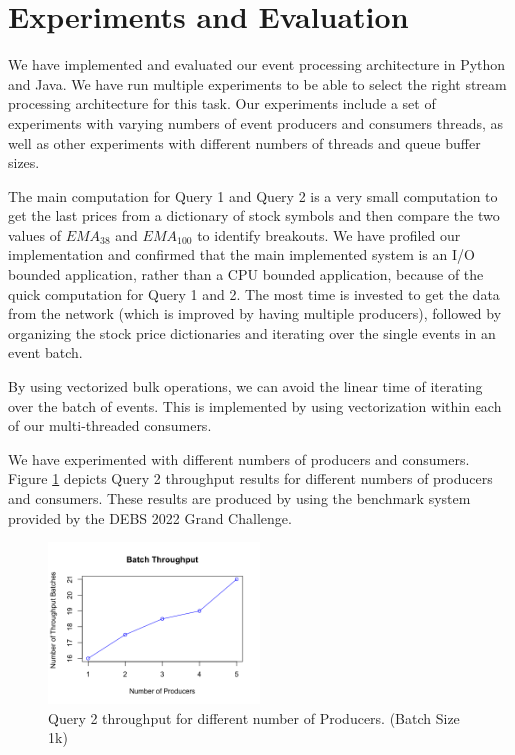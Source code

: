 \section{Experiments and Evaluation}\label{sec:experiments}
We have implemented and evaluated our event processing architecture in Python and Java. We have run multiple experiments to be
able to select the right stream processing architecture for this task. Our experiments include a set of experiments with varying
numbers of event producers and consumers threads, as well as other experiments with different numbers of threads and queue buffer sizes.

The main computation for Query 1 and Query 2 is a very small computation to get the last prices from a dictionary of stock symbols and then
compare the two values of $EMA_{38}$ and $EMA_{100}$ to identify breakouts. We have profiled our implementation and confirmed that the main implemented system
is an I/O bounded application, rather than a CPU bounded application, because of the quick computation for Query 1 and 2. The most time is
invested to get the data from the network (which is improved by having multiple producers), followed by organizing the stock price
dictionaries and iterating over the single events in an event batch.

By using vectorized bulk operations, we can avoid the linear time of iterating over the batch of events. This is implemented by using
vectorization within each of our multi-threaded consumers.

We have experimented with different numbers of producers and consumers.
Figure \ref{fig:evaluation} depicts Query 2 throughput results for different numbers of producers and consumers.
These results are produced by using the benchmark system provided by the DEBS 2022 Grand Challenge.


\begin{figure}[]
    \begin{center}
        \includegraphics[width=0.5\textwidth]{./images/throughput.png}
        \caption{Query 2 throughput for different number of Producers. (Batch Size 1k)}
        \label{fig:evaluation}
    \end{center}
\end{figure}


